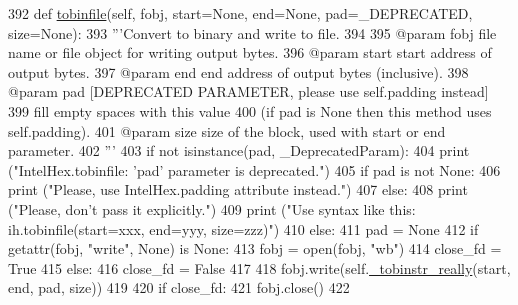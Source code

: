 \begin{DoxyCode}
392     \textcolor{keyword}{def }\hyperlink{classsoftware_1_1chipwhisperer_1_1capture_1_1utils_1_1IntelHex_1_1IntelHex_a1591d7944d6232ffbe20231e5b3547e0}{tobinfile}(self, fobj, start=None, end=None, pad=\_DEPRECATED, size=None):
393         \textcolor{stringliteral}{'''Convert to binary and write to file.}
394 \textcolor{stringliteral}{}
395 \textcolor{stringliteral}{        @param  fobj    file name or file object for writing output bytes.}
396 \textcolor{stringliteral}{        @param  start   start address of output bytes.}
397 \textcolor{stringliteral}{        @param  end     end address of output bytes (inclusive).}
398 \textcolor{stringliteral}{        @param  pad     [DEPRECATED PARAMETER, please use self.padding instead]}
399 \textcolor{stringliteral}{                        fill empty spaces with this value}
400 \textcolor{stringliteral}{                        (if pad is None then this method uses self.padding).}
401 \textcolor{stringliteral}{        @param  size    size of the block, used with start or end parameter.}
402 \textcolor{stringliteral}{        '''}
403         \textcolor{keywordflow}{if} \textcolor{keywordflow}{not} isinstance(pad, \_DeprecatedParam):
404             \textcolor{keywordflow}{print} (\textcolor{stringliteral}{"IntelHex.tobinfile: 'pad' parameter is deprecated."})
405             \textcolor{keywordflow}{if} pad \textcolor{keywordflow}{is} \textcolor{keywordflow}{not} \textcolor{keywordtype}{None}:
406                 \textcolor{keywordflow}{print} (\textcolor{stringliteral}{"Please, use IntelHex.padding attribute instead."})
407             \textcolor{keywordflow}{else}:
408                 \textcolor{keywordflow}{print} (\textcolor{stringliteral}{"Please, don't pass it explicitly."})
409                 \textcolor{keywordflow}{print} (\textcolor{stringliteral}{"Use syntax like this: ih.tobinfile(start=xxx, end=yyy, size=zzz)"})
410         \textcolor{keywordflow}{else}:
411             pad = \textcolor{keywordtype}{None}
412         \textcolor{keywordflow}{if} getattr(fobj, \textcolor{stringliteral}{"write"}, \textcolor{keywordtype}{None}) \textcolor{keywordflow}{is} \textcolor{keywordtype}{None}:
413             fobj = open(fobj, \textcolor{stringliteral}{"wb"})
414             close\_fd = \textcolor{keyword}{True}
415         \textcolor{keywordflow}{else}:
416             close\_fd = \textcolor{keyword}{False}
417 
418         fobj.write(self.\hyperlink{classsoftware_1_1chipwhisperer_1_1capture_1_1utils_1_1IntelHex_1_1IntelHex_a55a3436c4a45cc85f8c0d85add6f817a}{\_tobinstr\_really}(start, end, pad, size))
419 
420         \textcolor{keywordflow}{if} close\_fd:
421             fobj.close()
422 
\end{DoxyCode}
\hypertarget{classsoftware_1_1chipwhisperer_1_1capture_1_1utils_1_1IntelHex_1_1IntelHex_a63beaff3fa8ff85530da070327451542}{}
